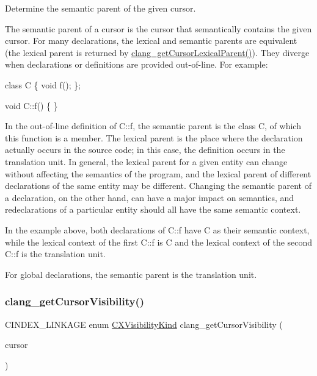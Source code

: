 Determine the semantic parent of the given cursor. 

The semantic parent of a cursor is the cursor that semantically contains the given {\ttfamily cursor}. For many declarations, the lexical and semantic parents are equivalent (the lexical parent is returned by {\ttfamily \hyperlink{group__CINDEX__CURSOR__MANIP_gace7a423874d72b3fdc71d6b0f31830dd}{clang\+\_\+get\+Cursor\+Lexical\+Parent()}}). They diverge when declarations or definitions are provided out-\/of-\/line. For example\+:


\begin{DoxyCode}
\textcolor{keyword}{class }C \{
 \textcolor{keywordtype}{void} f();
\};

\textcolor{keywordtype}{void} C::f() \{ \}
\end{DoxyCode}


In the out-\/of-\/line definition of {\ttfamily C\+::f}, the semantic parent is the class {\ttfamily C}, of which this function is a member. The lexical parent is the place where the declaration actually occurs in the source code; in this case, the definition occurs in the translation unit. In general, the lexical parent for a given entity can change without affecting the semantics of the program, and the lexical parent of different declarations of the same entity may be different. Changing the semantic parent of a declaration, on the other hand, can have a major impact on semantics, and redeclarations of a particular entity should all have the same semantic context.

In the example above, both declarations of {\ttfamily C\+::f} have {\ttfamily C} as their semantic context, while the lexical context of the first {\ttfamily C\+::f} is {\ttfamily C} and the lexical context of the second {\ttfamily C\+::f} is the translation unit.

For global declarations, the semantic parent is the translation unit. \mbox{\label{group__CINDEX__CURSOR__MANIP_ga935b442bd6bde168cf354b7629b471d8}} 
\subsubsection{\texorpdfstring{clang\+\_\+get\+Cursor\+Visibility()}{clang\_getCursorVisibility()}}
{\footnotesize\ttfamily C\+I\+N\+D\+E\+X\+\_\+\+L\+I\+N\+K\+A\+GE enum \hyperlink{group__CINDEX__CURSOR__MANIP_gaf92fafb489ab66529aceab51818994cb}{C\+X\+Visibility\+Kind} clang\+\_\+get\+Cursor\+Visibility (\begin{DoxyParamCaption}\item[{\hyperlink{structCXCursor}{C\+X\+Cursor}}]{cursor }\end{DoxyParamCaption})}



